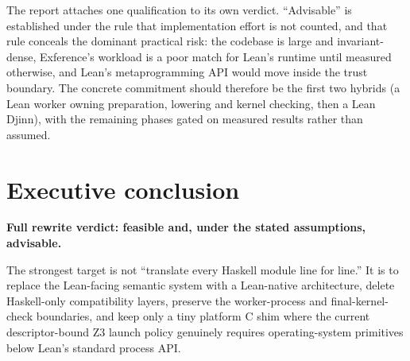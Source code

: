 \documentclass[10pt,letterpaper,oneside]{report}
\begin{document}
The report attaches one qualification to its own verdict. ``Advisable'' is established under the rule that implementation effort is not counted, and that rule conceals the dominant practical risk: the codebase is large and invariant-dense, Exference's workload is a poor match for Lean's runtime until measured otherwise, and Lean's metaprogramming API would move inside the trust boundary. The concrete commitment should therefore be the first two hybrids (a Lean worker owning preparation, lowering and kernel checking, then a Lean Djinn), with the remaining phases gated on measured results rather than assumed.

\tableofcontents
\clearpage
{}

\chapter*{Executive conclusion}

\begin{verdictbox}
\textbf{Full rewrite verdict: feasible and, under the stated assumptions, advisable.}

The strongest target is not ``translate every Haskell module line for line.'' It is to replace the Lean-facing semantic system with a Lean-native architecture, delete Haskell-only compatibility layers, preserve the worker-process and final-kernel-check boundaries, and keep only a tiny platform C shim where the current descriptor-bound Z3 launch policy genuinely requires operating-system primitives below Lean's standard process API.
\end{verdictbox}
\end{document}

